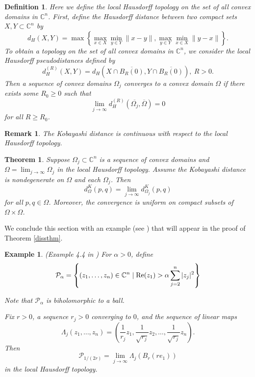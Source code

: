 \documentclass[12pt]{article}
\newcommand{\ds}{\displaystyle}
\newcommand{\C}{\mathbb{C}}
\newcommand{\re}{\textup{Re}}
\newtheorem{theorem}[lemma]{Theorem}
\newtheorem{defnition}[lemma]{Definition}
\newtheorem{remrk}[lemma]{Remark}
\newtheorem{exmple}[lemma]{Example}
\newenvironment{definition}{\begin{defnition} \em}{\end{defnition}}
\newenvironment{remark}{\begin{remrk} \em}{\end{remrk}}
\newenvironment{example}{\begin{exmple} \em}{\end{exmple}}
\begin{document}
\begin{definition}
\label{localhausdorffdef}
Here we define the \textit{local Hausdorff topology} on the set of all convex domains in $\C^n$. First, define the \textit{Hausdorff distance} between two compact sets $X,Y\subset\C^n$ by 
$$d_H(X,Y)=\max\left\{\max_{x\in X}\min_{y\in Y}\|x-y\|,\max_{y\in Y}\min_{x\in X}\|y-x\|\right\}.$$
To obtain a topology on the set of all convex domains in $\C^n$, we consider the \textit{local Hausdorff pseudodistances} defined by 
$$d_H^{(R)}(X,Y)=d_H\left(X\cap\overline{B_R(0)},Y\cap\overline{B_R(0)}\right), \ R>0.$$
Then a sequence of convex domains $\Omega_j$ converges to a convex domain $\Omega$ if there exists some $R_0\ge0$ such that 
$$\lim_{j\to\infty}d_H^{(R)}\left(\overline{\Omega_j},\overline{\Omega}\right)=0$$
for all $R\ge R_0$.
\end{definition}

\begin{remark}
The Kobayashi distance is continuous with respect to the local Hausdorff topology. 
\end{remark}

\begin{theorem}
\label{ZimThm4.2}
Suppose $\Omega_j\subset\C^n$ is a sequence of convex domains and $\ds\Omega=\lim_{j\to\infty}\Omega_j$ in the local Hausdorff topology. Assume the Kobayashi distance is nondegenerate on $\Omega$ and each $\Omega_j$. Then
$$d_{\Omega}^K(p,q)=\lim_{j\to\infty}d_{\Omega_j}^K(p,q)$$
for all $p,q\in\Omega$. Moreover, the convergence is uniform on compact subsets of $\Omega\times\Omega$.
\end{theorem}

We conclude this section with an example (see \cite{Zimmer}) that will appear in the proof of Theorem \ref{dissthm}.

\begin{example}(Example 4.4 in \cite{Zimmer})
\label{Zex4.4}
For $\alpha>0$, define
$$\mathcal{P}_{\alpha}=\left\{(z_1,\dots,z_n)\in\C^n\mid\re(z_1)>\alpha\sum_{j=2}^{n}|z_j|^2\right\}$$

Note that $\mathcal{P}_{\alpha}$ is biholomorphic to a ball.

Fix $r>0$, a sequence $r_j>0$ converging to $0$, and the sequence of linear maps
$$\Lambda_j(z_1,\dots,z_n)=\left(\frac{1}{r_j}z_1,\frac{1}{\sqrt{r_j}}z_2,\dots,\frac{1}{\sqrt{r_j}}z_n\right).$$
Then $$\mathcal{P}_{1/(2r)}=\lim_{j\to\infty}\Lambda_j(B_r(re_1))$$ in the local Hausdorff topology.
\end{example}
\end{document}
